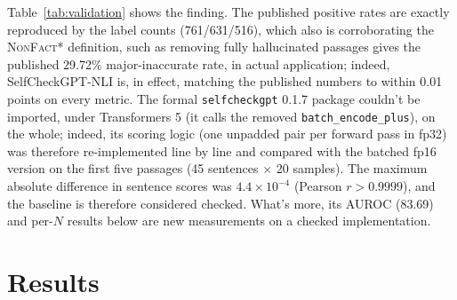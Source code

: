 \documentclass[acmsmall,screen,review,nonacm]{acmart}
\newcommand{\nf}{\textsc{NonFact}}
\begin{document}
Table~\ref{tab:validation} shows the finding. The published positive rates are exactly reproduced by the label counts (761/631/516), which also is corroborating the \nf{}* definition, such as removing fully hallucinated passages gives the published 29.72\% major-inaccurate rate, in actual application; indeed, SelfCheckGPT-NLI is, in effect, matching the published numbers to within 0.01 points on every metric. The formal \texttt{selfcheckgpt} 0.1.7 package couldn't be imported, under Transformers 5 (it calls the removed \texttt{batch\_encode\_plus}), on the whole; indeed, its scoring logic (one unpadded pair per forward pass in fp32) was therefore re-implemented line by line and compared with the batched fp16 version on the first five passages (45 sentences $\times$ 20 samples). The maximum absolute difference in sentence scores was $4.4\times10^{-4}$ (Pearson $r>0.9999$), and the baseline is therefore considered checked. What's more, its AUROC (83.69) and per-$N$ results below are new measurements on a checked implementation.

\section{Results}
\label{sec:results}
\end{document}
